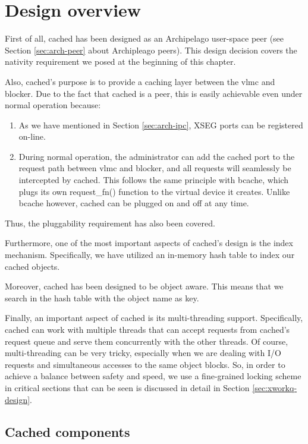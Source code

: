 \section{Design overview}

First of all, cached has been designed as an Archipelago user-space peer (see 
Section \ref{sec:arch-peer} about Archipleago peers). This design decision 
covers the nativity requirement we posed at the beginning of this chapter.

Also, cached's purpose is to provide a caching layer between the vlmc and 
blocker. Due to the fact that cached is a peer, this is easily achievable even 
under normal operation because:

\begin{enumerate}
	\item 
		As we have mentioned in Section \ref{sec:arch-ipc}, XSEG ports 
		can be registered on-line.
	\item
		During normal operation, the administrator can add the cached 
		port to the request path between vlmc and blocker, and all 
		requests will seamlessly be intercepted by cached. This follows 
		the same principle with bcache, which plugs its own 
		request\_fn() function to the virtual device it creates.  Unlike 
		bcache however, cached can be plugged on and off at any time.
\end{enumerate}

Thus, the pluggability requirement has also been covered.

Furthermore, one of the most important aspects of cached's design is the index 
mechanism. Specifically, we have utilized an in-memory hash table to index our 
cached objects.

Moreover, cached has been designed to be object aware. This means that we search 
in the hash table with the object name as key.%


Finally, an important aspect of cached is its multi-threading support.  
Specifically, cached can work with multiple threads that can accept requests 
from cached's request queue and serve them concurrently with the other threads.  
Of course, multi-threading can be very tricky, especially when we are dealing 
with I/O requests and simultaneous accesses to the same object blocks. So, in 
order to achieve a balance between safety and speed, we use a
fine-grained locking scheme in critical sections that can be seen is discussed 
in detail in Section \ref{sec:xworkq-design}.

\subsection{Cached components}

